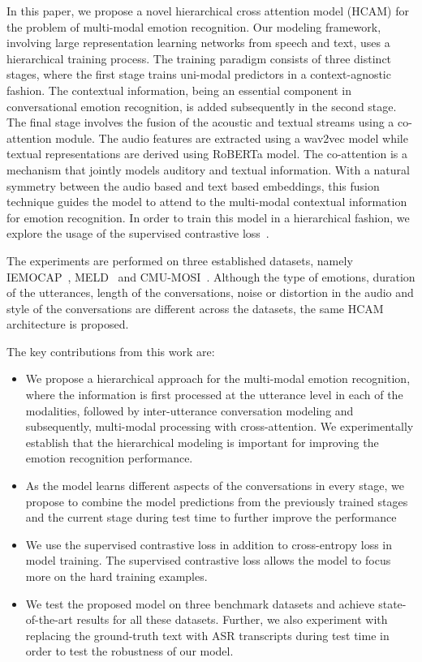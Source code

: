 \documentclass[lettersize,journal]{IEEEtran}
\begin{document}
 In this paper, we propose a novel hierarchical cross attention model (HCAM) for the problem of multi-modal emotion recognition. Our modeling framework, involving large representation learning networks from speech and text, uses a hierarchical training process. The training paradigm consists of three distinct stages, where the first stage trains uni-modal predictors in a context-agnostic fashion. The contextual information, being an essential component in conversational emotion recognition, is added subsequently in the second stage. The final stage involves the fusion of the acoustic and textual streams using a co-attention module.
  The audio features are extracted using a wav2vec model \cite{baevski2020wav2vec}  while textual representations are derived using RoBERTa \cite{liu2019roberta}  model. The co-attention is a mechanism that jointly models  auditory and textual information. With a natural symmetry between the audio based and text based embeddings, this fusion technique guides the model to attend to the multi-modal contextual information for emotion recognition.    
In order to train this model in a hierarchical fashion, we explore the usage of the supervised contrastive loss~\cite{khosla2020supervised}.

The experiments are performed on three established datasets, namely IEMOCAP~\cite{busso2008iemocap}, MELD~\cite{poria2019meld} and CMU-MOSI~\cite{zadeh2016mosi}. Although the  type of emotions, duration of the utterances, length of the conversations, noise or distortion in the audio and style of the conversations are different across the datasets, the same HCAM  architecture is proposed.


The key contributions from this work are:
\begin{itemize}
    \item We propose a hierarchical approach for the multi-modal emotion recognition, where the information is first processed at the utterance level in each of the modalities, followed by inter-utterance conversation  modeling and subsequently, multi-modal processing with cross-attention.  We experimentally establish that the hierarchical modeling is important for improving the emotion recognition performance. 
    \item As the model learns different aspects of the conversations in every stage, we propose to combine the model predictions from the previously trained stages and the current stage during test time to further improve the performance
    \item We use the supervised contrastive loss in addition to cross-entropy loss in model training. The supervised contrastive loss allows the model to focus more on the  hard training examples. 
    \item We test the proposed model on three  benchmark datasets and achieve state-of-the-art results for all these datasets. Further, we also experiment with replacing the ground-truth text with ASR transcripts during test time in order to test the robustness of our model.
\end{itemize}\par
\end{document}
